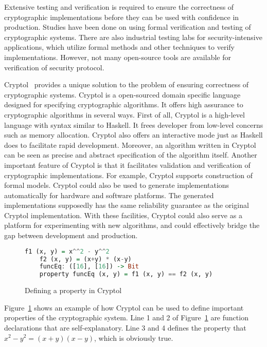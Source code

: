 \documentclass[a4paper, notitlepage]{report}
\begin{document}
Extensive testing and verification is required
to ensure the correctness of cryptographic implementations
before they can be used with confidence in production.
Studies have been done on using formal verification
and testing of cryptographic systems.
There are also industrial testing labs for security-intensive applications,
which utilize formal methods and other techniques to verify implementations.
However, not many open-source tools are available
for verification of security protocol.

Cryptol~\cite{lewis2003cryptol} provides a unique solution to the problem of
ensuring correctness of cryptographic systems. Cryptol is a
open-sourced domain specific language designed for specifying 
cryptographic algorithms.
It offers high assurance to cryptographic algorithms in several ways.
First of all, Cryptol is a high-level language with syntax similar to Haskell.
It frees developer from low-level concerns such as memory allocation.
Cryptol also offers an interactive mode just as Haskell does to facilitate
rapid development.
Moreover, an algorithm written in Cryptol can be seen as
precise and abstract specification of the algorithm itself.
Another important feature of Cryptol is that it facilitates validation and
verification of cryptographic implementations.
For example, Cryptol supports construction of formal models.
Cryptol could also be used to generate implementations automatically
for hardware and software platforms. The generated implementations
supposedly has the same reliability guarantee as the original Cryptol
implementation. With these facilities, Cryptol could also serve as
a platform for experimenting with new algorithms, and could effectively
bridge the gap between development and production.

\begin{figure}
  \begin{lstlisting}[language=Haskell, frame=single]
    f1 (x, y) = x^^2 - y^^2
    f2 (x, y) = (x+y) * (x-y)
    funcEq: ([16], [16]) -> Bit
    property funcEq (x, y) = f1 (x, y) == f2 (x, y)
  \end{lstlisting}
  \caption{Defining a property in Cryptol}
  \label{fig:property}
\end{figure}

Figure~\ref{fig:property} shows an example of how Cryptol can be used to
define important properties of the cryptographic system.
Line 1 and 2 of Figure~\ref{fig:property} are function declarations
that are self-explanatory.
Line 3 and 4 defines the property that $x^2 - y^2 = (x+y)(x-y)$, which
is obviously true. 
\end{document}
